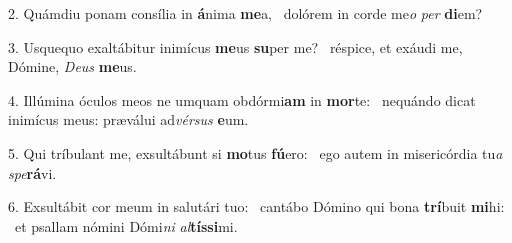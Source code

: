 2. Quámdiu ponam consília in \textbf{á}nima \textbf{me}a, \ast\  dolórem in corde me\textit{o} \textit{per} \textbf{di}em?\

3. Usquequo exaltábitur inimícus \textbf{me}us \textbf{su}per me? \ast\  réspice, et exáudi me, Dómine, \textit{De}\textit{us} \textbf{me}us.\

4. Illúmina óculos meos ne umquam obdórmi\textbf{am} in \textbf{mor}te: \ast\  nequándo dicat inimícus meus: præválui ad\textit{vér}\textit{sus} \textbf{e}um.\

5. Qui tríbulant me, exsultábunt si \textbf{mo}tus \textbf{fú}ero: \ast\  ego autem in misericórdia tu\textit{a} \textit{spe}\textbf{rá}vi.\

6. Exsultábit cor meum in salutári tuo: \dag\  cantábo Dómino qui bona \textbf{trí}buit \textbf{mi}hi: \ast\  et psallam nómini Dómi\textit{ni} \textit{al}\textbf{tís}\textbf{si}mi.\

